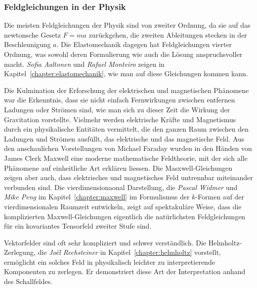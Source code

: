%
%
\subsubsection{Feldgleichungen in der Physik}

%
%
Die meisten Feldgleichungen der Physik sind von zweiter Ordnung, da
sie auf das newtonsche Gesetz $F=ma$ zurückgehen, die zweiten
Ableitungen stecken in der Beschleunigung $a$.
Die Elastomechanik dagegen hat Feldgleichungen vierter Ordnung,
%
was sowohl deren Formulierung wie auch die Lösung anspruchsvoller
macht.
\emph{Sofia Aaltonen}
%
%
und
\emph{Rafael Monteiro}
%
%
zeigen in Kapitel~\ref{chapter:elastomechanik}, wie man auf diese
Gleichungen kommen kann.

%
%
Die Kulmination der Erforschung der elektrischen und magnetischen
Phänomene war die Erkenntnis, dass sie nicht einfach Fernwirkungen
zwischen entfernen Ladungen oder Strömen sind, wie man sich zu
dieser Zeit die Wirkung der Gravitation vorstellte.
Vielmehr werden elektrische Kräfte und Magnetismus durch ein
physikalische Entitäten vermittelt, die den ganzen Raum zwischen den
Ladungen und Strömen ausfüllt, das elektrische und das magnetische
Feld.
Aus den anschaulichen Vorstellungen von Michael Faraday wurden in den
%
Händen von James Clerk Maxwell eine moderne mathematische Feldtheorie,
%
mit der sich alle Phänomene auf einheitliche Art erklären liessen.
Die Masxwell-Gleichungen zeigen aber auch, dass elektrisches und
magnetisches Feld untrennbar miteinander verbunden sind.
Die vierdimensionaonal Darstellung, die \emph{Pascal Widmer}
%
%
und \emph{Mike Peng}
%
%
im Kapitel~\ref{chapter:maxwell} im Formulismus der $k$-Formen auf
der vierdimensionalen Raumzeit entwickeln, zeigt auf spektakuläre
Weise, dass die komplizierten Maxwell-Gleichungen eigentlich die
natürlichsten Feldgleichungen für ein kovariantes Tensorfeld zweiter
Stufe sind.

%
%
Vektorfelder sind oft sehr kompliziert und schwer verständlich.
Die Helmholtz-Zer\-le\-gung, die
%
\emph{Joël Rechsteiner} 
%
%
in Kapitel~\ref{chapter:helmholtz} vorstellt, ermöglicht ein solches
Feld in physikalisch leichter zu interpretierende Komponenten zu
zerlegen. 
Er demonstriert diese Art der Interpretation anhand des Schallfeldes.

